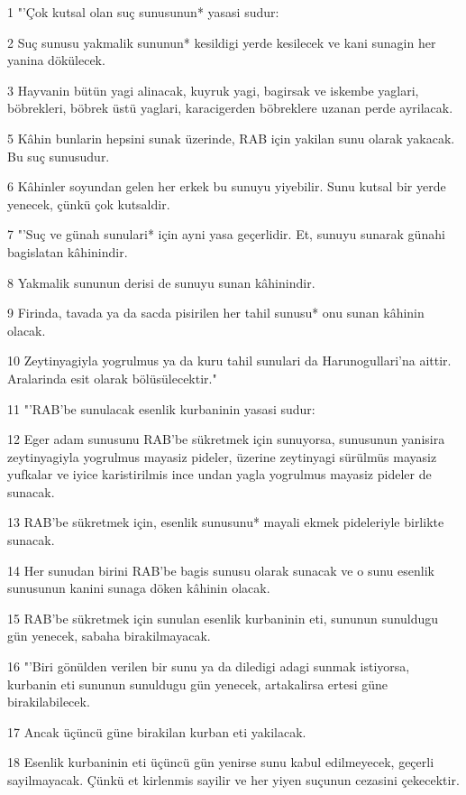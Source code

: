 \par 1 "'Çok kutsal olan suç sunusunun* yasasi sudur:
\par 2 Suç sunusu yakmalik sununun* kesildigi yerde kesilecek ve kani sunagin her yanina dökülecek.
\par 3 Hayvanin bütün yagi alinacak, kuyruk yagi, bagirsak ve iskembe yaglari, böbrekleri, böbrek üstü yaglari, karacigerden böbreklere uzanan perde ayrilacak.
\par 5 Kâhin bunlarin hepsini sunak üzerinde, RAB için yakilan sunu olarak yakacak. Bu suç sunusudur.
\par 6 Kâhinler soyundan gelen her erkek bu sunuyu yiyebilir. Sunu kutsal bir yerde yenecek, çünkü çok kutsaldir.
\par 7 "'Suç ve günah sunulari* için ayni yasa geçerlidir. Et, sunuyu sunarak günahi bagislatan kâhinindir.
\par 8 Yakmalik sununun derisi de sunuyu sunan kâhinindir.
\par 9 Firinda, tavada ya da sacda pisirilen her tahil sunusu* onu sunan kâhinin olacak.
\par 10 Zeytinyagiyla yogrulmus ya da kuru tahil sunulari da Harunogullari'na aittir. Aralarinda esit olarak bölüsülecektir."
\par 11 "'RAB'be sunulacak esenlik kurbaninin yasasi sudur:
\par 12 Eger adam sunusunu RAB'be sükretmek için sunuyorsa, sunusunun yanisira zeytinyagiyla yogrulmus mayasiz pideler, üzerine zeytinyagi sürülmüs mayasiz yufkalar ve iyice karistirilmis ince undan yagla yogrulmus mayasiz pideler de sunacak.
\par 13 RAB'be sükretmek için, esenlik sunusunu* mayali ekmek pideleriyle birlikte sunacak.
\par 14 Her sunudan birini RAB'be bagis sunusu olarak sunacak ve o sunu esenlik sunusunun kanini sunaga döken kâhinin olacak.
\par 15 RAB'be sükretmek için sunulan esenlik kurbaninin eti, sununun sunuldugu gün yenecek, sabaha birakilmayacak.
\par 16 "'Biri gönülden verilen bir sunu ya da diledigi adagi sunmak istiyorsa, kurbanin eti sununun sunuldugu gün yenecek, artakalirsa ertesi güne birakilabilecek.
\par 17 Ancak üçüncü güne birakilan kurban eti yakilacak.
\par 18 Esenlik kurbaninin eti üçüncü gün yenirse sunu kabul edilmeyecek, geçerli sayilmayacak. Çünkü et kirlenmis sayilir ve her yiyen suçunun cezasini çekecektir.
